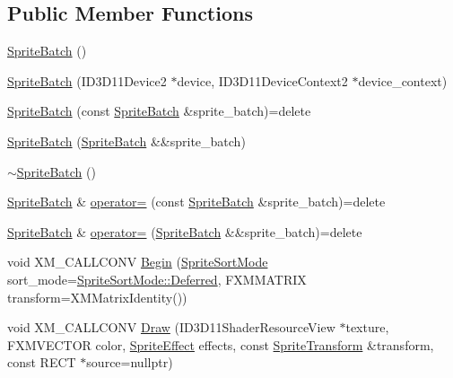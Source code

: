\subsection*{Public Member Functions}
\begin{DoxyCompactItemize}
\item 
\hyperlink{classmage_1_1_sprite_batch_a75924326627c792ff454d9d2a2ba1fda}{Sprite\+Batch} ()
\item 
\hyperlink{classmage_1_1_sprite_batch_abcca486a836cc2996d3d1a1169df83ad}{Sprite\+Batch} (I\+D3\+D11\+Device2 $\ast$device, I\+D3\+D11\+Device\+Context2 $\ast$device\+\_\+context)
\item 
\hyperlink{classmage_1_1_sprite_batch_a10fe1d6cf1d2de9e087b370e7d696be8}{Sprite\+Batch} (const \hyperlink{classmage_1_1_sprite_batch}{Sprite\+Batch} \&sprite\+\_\+batch)=delete
\item 
\hyperlink{classmage_1_1_sprite_batch_a16f89aba054d8a08e5257c46813f4713}{Sprite\+Batch} (\hyperlink{classmage_1_1_sprite_batch}{Sprite\+Batch} \&\&sprite\+\_\+batch)
\item 
\hyperlink{classmage_1_1_sprite_batch_a1c284e2c0ed96081f9f2fb1f84e5817f}{$\sim$\+Sprite\+Batch} ()
\item 
\hyperlink{classmage_1_1_sprite_batch}{Sprite\+Batch} \& \hyperlink{classmage_1_1_sprite_batch_aa2a5df588d7589a36b38b35dc8a08a48}{operator=} (const \hyperlink{classmage_1_1_sprite_batch}{Sprite\+Batch} \&sprite\+\_\+batch)=delete
\item 
\hyperlink{classmage_1_1_sprite_batch}{Sprite\+Batch} \& \hyperlink{classmage_1_1_sprite_batch_ad46c172200bf47c10fa13fb3a70a4104}{operator=} (\hyperlink{classmage_1_1_sprite_batch}{Sprite\+Batch} \&\&sprite\+\_\+batch)=delete
\item 
void X\+M\+\_\+\+C\+A\+L\+L\+C\+O\+NV \hyperlink{classmage_1_1_sprite_batch_a0c86254b49fd51f90db1231ac08cd521}{Begin} (\hyperlink{namespacemage_a256fa5833eecc408923de7ffadb5e014}{Sprite\+Sort\+Mode} sort\+\_\+mode=\hyperlink{namespacemage_a5e7e18b0154373ce8fc942fe3f6b27fda4ed71db54748b36eeb398876b0c747ac}{Sprite\+Sort\+Mode\+::\+Deferred}, F\+X\+M\+M\+A\+T\+R\+IX transform=X\+M\+Matrix\+Identity())
\item 
void X\+M\+\_\+\+C\+A\+L\+L\+C\+O\+NV \hyperlink{classmage_1_1_sprite_batch_aa1c49a91ab7f863ec51276d496ae1e66}{Draw} (I\+D3\+D11\+Shader\+Resource\+View $\ast$texture, F\+X\+M\+V\+E\+C\+T\+OR color, \hyperlink{namespacemage_a9cfe18123066ba4236f548f9de75d881}{Sprite\+Effect} effects, const \hyperlink{structmage_1_1_sprite_transform}{Sprite\+Transform} \&transform, const R\+E\+CT $\ast$source=nullptr)

\end{DoxyCompactItemize}
